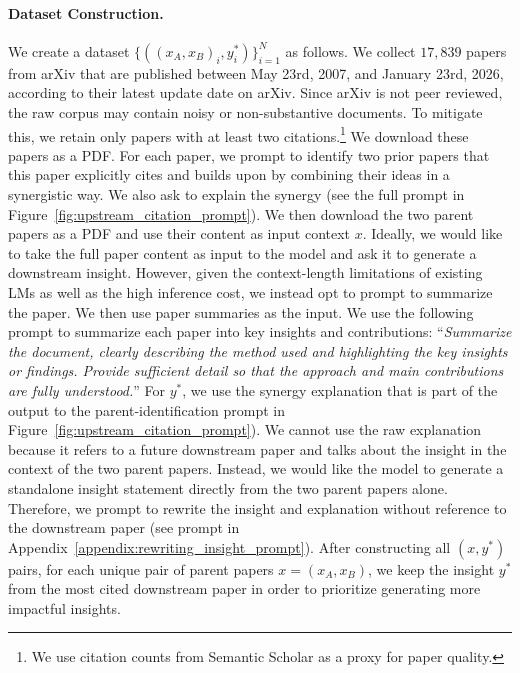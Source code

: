 \paragraph{Dataset Construction.}
We create a dataset $\{((x_A, x_B)_i, y^*_i)\}_{i=1}^N$ as follows. We collect $17{,}839$ papers from arXiv that are published between May 23rd, 2007, and January 23rd, 2026, according to their latest update date on arXiv. Since arXiv is not peer reviewed, the raw corpus may contain noisy or non-substantive documents. To mitigate this, we retain only papers with at least two citations.\footnote{We use citation counts from Semantic Scholar as a proxy for paper quality.} We download these papers as a PDF. For each paper, we prompt \gemtwoflash{}
to identify two prior papers that this paper explicitly cites and builds upon by combining their ideas in a synergistic way. We also ask \gemtwoflash{} to explain the synergy (see the full prompt in Figure~\ref{fig:upstream_citation_prompt}). We then download the two parent papers as a PDF and use their content as input context $x$. Ideally, we would like to take the full paper content as input to the model and ask it to generate a downstream insight. However, given the context-length limitations of existing LMs as well as the high inference cost, we instead opt to prompt \gemtwoflash{} to summarize the paper. We then use paper summaries as the input. 
We use the following prompt to summarize each paper into key insights and contributions: ``\textit{Summarize the document, clearly describing the method used and highlighting the key insights or findings. Provide sufficient detail so that the approach and main contributions are fully understood.}'' 
For $y^*$, we use the synergy explanation that is part of the output to the parent-identification prompt in Figure~\ref{fig:upstream_citation_prompt}). 
We cannot use the raw explanation because it refers to a future downstream paper and talks about the insight in the context of the two parent papers. Instead, we would like the model to generate a standalone insight statement directly from the two parent papers alone. Therefore, we prompt \gemthreepro{} to rewrite the insight and explanation without reference to the downstream paper (see prompt in Appendix~\ref{appendix:rewriting_insight_prompt}). After constructing all $(x,y^*)$ pairs, for each unique pair of parent papers $x=(x_A, x_B)$, we keep the insight $y^*$ from the most cited downstream paper in order to prioritize generating more impactful insights.

